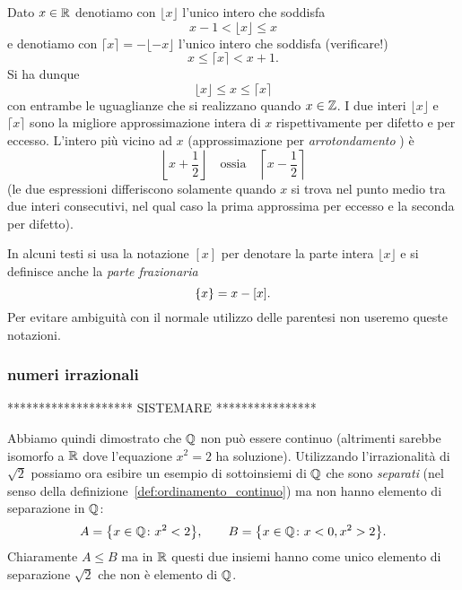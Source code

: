 \begin{definition}
  \mymark{**}%
%
  Dato $x\in {\mathbb R}$ denotiamo con $\lfloor x\rfloor$ l'unico intero
  che soddisfa
  \mymargin{$\lfloor\cdot\rfloor$} %
  \[
    x - 1 < \lfloor x \rfloor \le x
  \]
  e denotiamo con $\lceil x \rceil = - \lfloor -x \rfloor$ l'unico intero che soddisfa (verificare!)
  \mymargin{$\lceil\cdot\rceil$} %
  \[
    x \le \lceil x \rceil < x + 1.
  \]
  Si ha dunque
  \[
    \lfloor x \rfloor \le x \le \lceil x \rceil
  \]
  con entrambe le uguaglianze che si realizzano quando $x\in {\mathbb Z}$.
  I due interi $\lfloor x \rfloor$ e $\lceil x \rceil$
  sono la migliore approssimazione intera di $x$ rispettivamente
  per difetto e per eccesso.
  L'intero più vicino ad $x$ (approssimazione per \emph{arrotondamento}%
%
)
  è
  \[
    \left\lfloor x + \frac 1 2 \right\rfloor
  \quad \text{ossia} \quad
    \left\lceil x-\frac 1 2 \right\rceil
  \]
  (le due espressioni differiscono solamente quando $x$ si trova nel punto medio tra 
  due interi consecutivi, nel qual caso la prima approssima per eccesso e la seconda 
  per difetto).
\end{definition}

In alcuni testi si usa la notazione $[x]$ per denotare la parte intera $\lfloor x \rfloor$ e si definisce
anche la \emph{parte frazionaria}
\[
  {\left\{ x \right\}} = x - [x].
\]
Per evitare ambiguità con il normale utilizzo delle parentesi
non useremo queste notazioni.


\subsubsection{numeri irrazionali}


******************** SISTEMARE ****************


Abbiamo quindi dimostrato che ${\mathbb Q}$ non può essere continuo (altrimenti 
sarebbe isomorfo a ${\mathbb R}$ dove l'equazione $x^2=2$ ha soluzione). 
Utilizzando l'irrazionalità di $\sqrt 2$ 
possiamo ora esibire un esempio di sottoinsiemi di ${\mathbb Q}$ che sono 
\emph{separati} (nel senso della definizione~\ref{def:ordinamento_continuo})
ma non hanno elemento di separazione in ${\mathbb Q}$:
\[
A= {\left\{ x\in{\mathbb Q}\colon x^2< 2 \right\}},
\qquad
B = {\left\{ x\in {\mathbb Q}\colon x<0, x^2>2 \right\}}.  
\]
Chiaramente $A\le B$ ma in ${\mathbb R}$ questi due insiemi 
hanno come unico elemento di separazione $\sqrt 2$ che non è elemento di
${\mathbb Q}$.

